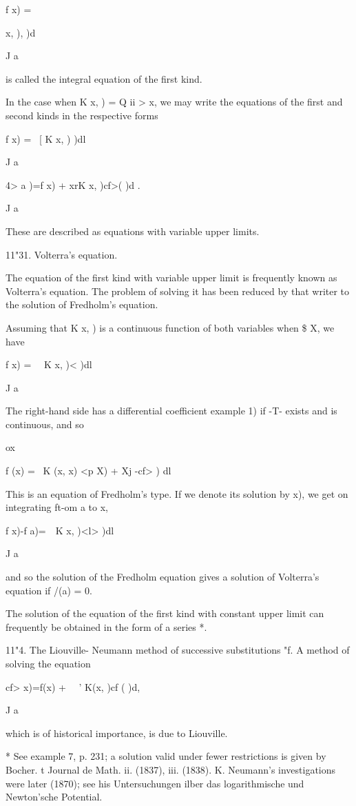f x) = \ \ \ \ {x, ), )d

J a

is called the integral equation of the first kind.

In the case when K x, ) = Q ii > x, we may write the equations of the
first and second kinds in the respective forms

f x) = \ [ K x, ) )dl

J a

4> a )=f x) + xrK x, )cf>( )d .

J a

These are described as equations with variable upper limits.

11"31. Volterra's equation.

The equation of the first kind with variable upper limit is frequently
known as Volterra's equation. The problem of solving it has been
reduced by that writer to the solution of Fredholm's equation.

Assuming that K x, ) is a continuous function of both variables when
\$ X, we have

f x) = \ \ K x, )< )dl

J a

The right-hand side has a differential coefficient  example 1)
if -T- exists and is continuous, and so

ox

f (x) = \ K (x, x) <p X) + Xj -cf> ) dl

This is an equation of Fredholm's type. If we denote its solution by
x), we get on integrating ft-om a to x,

f x)-f a)=\ \ K x, )<l> )dl

J a

and so the solution of the Fredholm equation gives a solution of
Volterra's equation if /(a) = 0.

The solution of the equation of the first kind with constant upper
limit can frequently be obtained in the form of a series *.

11"4. The Liouville- Neumann method of successive substitutions "f. A
method of solving the equation

cf> x)=f(x) + \ \ ' K(x, )cf ( )d,

J a

which is of historical importance, is due to Liouville.

* See example 7, p. 231; a solution valid under fewer restrictions is
given by Bocher. t Journal de Math. ii. (1837), iii. (1838). K.
Neumann's investigations were later (1870); see his Untersuchungen
ilber das logarithmische und Newton'sche Potential.

}
